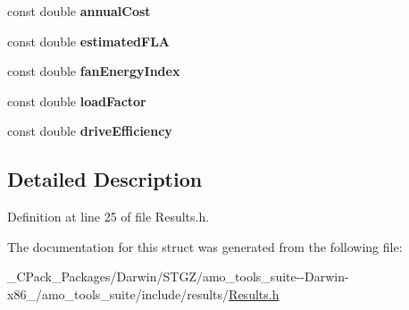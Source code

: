 \begin{DoxyCompactItemize}
const double {\bfseries annual\+Cost}
\item 
\mbox{\label{struct_fan_result_1_1_output_a87dc83a57a717ae2c7071cbe60459960}} 
const double {\bfseries estimated\+F\+LA}
\item 
\mbox{\label{struct_fan_result_1_1_output_a4ecd26ce3f950d847f562bbc709af587}} 
const double {\bfseries fan\+Energy\+Index}
\item 
\mbox{\label{struct_fan_result_1_1_output_af69651dbc14072bec6c9f009193c62fa}} 
const double {\bfseries load\+Factor}
\item 
\mbox{\label{struct_fan_result_1_1_output_ab810ca79692a37edee5d97ff578e994d}} 
const double {\bfseries drive\+Efficiency}
\end{DoxyCompactItemize}


\subsection{Detailed Description}


Definition at line 25 of file Results.\+h.



The documentation for this struct was generated from the following file\+:\begin{DoxyCompactItemize}
\item 
\+\_\+\+C\+Pack\+\_\+\+Packages/\+Darwin/\+S\+T\+G\+Z/amo\+\_\+tools\+\_\+suite-\/-\/\+Darwin-\/x86\+\_/amo\+\_\+tools\+\_\+suite/include/results/\hyperlink{___c_pack___packages_2_darwin_2_s_t_g_z_2amo__tools__suite--_darwin-x86__64_2amo__tools__suite_2include_2results_2_results_8h}{Results.\+h}\end{DoxyCompactItemize}
